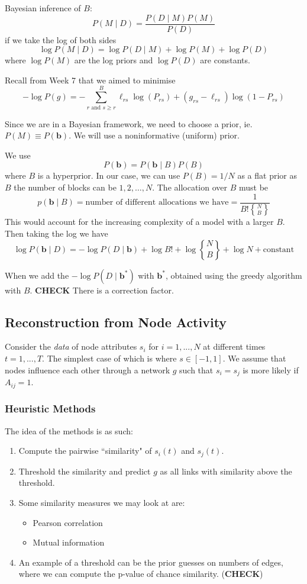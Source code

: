 \documentclass[12pt]{article}
\theoremstyle{definition}
\newcommand{\B}[1]{\boldsymbol{\boldsymbol{#1}}}
\newcommand{\br}[1]{\left({#1}\right)}
\begin{document}
Bayesian inference of $B$:
\[
P(M\mid D)=\frac{P(D\mid M)P(M)}{P(D)}
\]
if we take the log of both sides
\[
\log P(M\mid D) = \log P(D\mid M) + \log P(M) + \log P(D)
\]
where $\log P(M)$ are the log priors and $\log P(D)$ are constants. 

Recall from Week 7 that we aimed to minimise
\[
-\log P\br{g} = -\sum_{r\text{ and }s\geq r}^B \ell_{rs} \log(P_{rs}) +\br{g_{rs}-\ell_{rs}}\log(1-P_{rs})
\]

Since we are in a Bayesian framework, we need to choose a prior, ie. $P(M)\equiv P(\boldsymbol{b})$. We will use a noninformative (uniform) prior.

We use
\[P(\boldsymbol{b}) = P(\boldsymbol{b}\mid B)P(B)\]
where $B$ is a hyperprior. In our case, we can use $P(B)=1/N$ as a flat prior as $B$ the number of blocks can be $1,2,\dots, N$. The allocation over $B$ must be 
\[ p(\boldsymbol b\mid B) = \text{number of different allocations we have} = \frac{1}{B! \genfrac\{\}{0pt}{}{N}{B}}\]
This would account for the increasing complexity of a model with a larger $B$. Then taking the log we have
\[
\log P(\B{b}\mid D) = - \log P(D\mid \B{b}) + \log B! + \log \genfrac\{\}{0pt}{}{N}{B} + \log N + \mathrm{constant}
\]

When we add the $-\log P(D\mid \boldsymbol{b}^*)$ with $\boldsymbol{b}^*$, obtained using the greedy algorithm with $B$. \textbf{CHECK}
There is a correction factor.

\subsection{Reconstruction from Node Activity}

Consider the \textit{data} of node attributes $s_i$ for $i=1,...,N$ at different times $t=1,...,T$. The simplest case of which is where $s\in[-1,1]$. We assume that nodes influence each other through a network $g$ such that $s_i=s_j$ is more likely if $A_{ij}=1$. 

\subsubsection{Heuristic Methods}

The idea of the methods is as such: 
\begin{enumerate}
    \item Compute the pairwise ``similarity" of $s_i(t)$ and $s_j(t)$. 
    \item Threshold the similarity and predict $g$ as all links with similarity above the threshold. 
    \item Some similarity measures we may look at are:
    \begin{itemize}
        \item Pearson correlation
        \item Mutual information
    \end{itemize} 
    \item An example of a threshold can be the prior guesses on numbers of edges, where we can compute the p-value of chance similarity. (\textbf{CHECK})
\end{enumerate}
\end{document}
